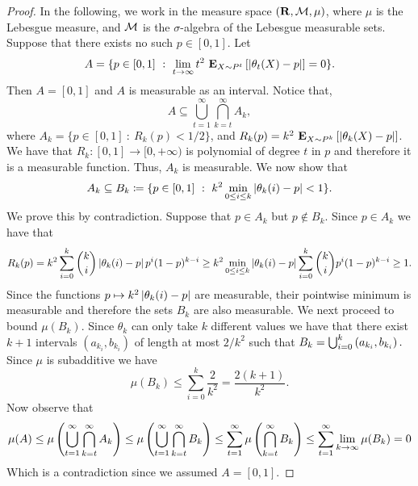 \begin{proof}
  In the following, we work in the measure space
  $(\bm{\mathrm{R}}, \mathcal{M}, \mu)$, where $\mu$ is the Lebesgue measure,
  and $\mathcal{M}$ is the $\sigma$-algebra of the Lebesgue measurable
  sets.
  Suppose that there exists no such $p \in [0,1]$.
  Let
  \[
    A =
    \{
    p \in [0,1]\ :\ \lim_{t\to \infty}
    t^2\ \bm{\mathrm{E}}_{X \sim P^t} \left[ \left| \theta_t(X) - p \right| \right] = 0
    \}.
  \]
  Then $A = [0,1]$ and $A$ is measurable as an interval.
  Notice that,
  \[
    A \subseteq \bigcup_{t=1}^{\infty} \bigcap_{k=t}^{\infty} A_k,
  \]
  where \( A_k = \{ p\in[0,1]\ :\ R_k(p) < 1/2 \} \),
  and \(R_k(p) = k^2\ \bm{\mathrm{E}}_{X \sim P^k} \left[ | \theta_k(X) - p| \right]\).
  We have that $R_k: [0,1] \to [0, +\infty) $ is polynomial of
  degree $t$ in $p$ and therefore it is a measurable function.
  Thus, $A_k$ is measurable.
  We now show that
  \[ A_k \subseteq B_k \coloneqq \{ p \in [0,1]\ : \
    k^2 \min_{0 \leq i \leq k} \left| \theta_k(i) - p \right| < 1 \}.
  \]
  We prove this by contradiction. Suppose that $p \in A_k$ but
  $p \notin B_k$. Since $p \in A_k$ we have that
  \begin{align*}
    R_k(p)
    =
    k^2 \sum_{i=0}^k \binom{k}{i} \left| \theta_k(i) - p \right| p^i (1-p)^{k-i}
    \geq
    k^2 \min_{0 \leq i \leq k} \left| \theta_k(i) - p \right|
    \sum_{i=0}^k \binom{k}{i} p^i (1-p)^{k-i}
    \geq 1.
  \end{align*}
  Since the functions $p \mapsto k^2 \left| \theta_k(i) - p \right|$ are
  measurable, their pointwise minimum is measurable and therefore
  the sets $B_k$ are also measurable.  We next proceed to bound
  $\mu(B_k)$. Since $\theta_k$ can only take $k$ different values
  we have that there exist $k+1$ intervals $(a_{k_i}, b_{k_i})$
  of length at most $2/k^2$ such that
  \(
    B_k = \bigcup_{i=0}^k \left(a_{k_i}, b_{k_i} \right).
  \)
  Since $\mu$ is subadditive we have
  \[
    \mu(B_k) \leq \sum_{i=0}^{k} \frac{2}{k^2} = \frac{2 (k+1)}{k^2}.  \]
  Now observe that
  \begin{align*}
    \mu(A)
    \leq \mu \left( \bigcup_{t=1}^{\infty} \bigcap_{k=t}^{\infty} A_k \right)
    \leq \mu \left( \bigcup_{t=1}^{\infty} \bigcap_{k=t}^{\infty} B_k \right)
    \leq \sum_{t = 1}^{\infty} \mu\left(\bigcap_{k=t}^{\infty} B_k \right)
    \leq \sum_{t = 1}^{\infty} \lim_{k \to \infty} \mu(B_k)
    = 0
  \end{align*}
  Which is a contradiction since we assumed $A = [0,1]$.
\end{proof}
